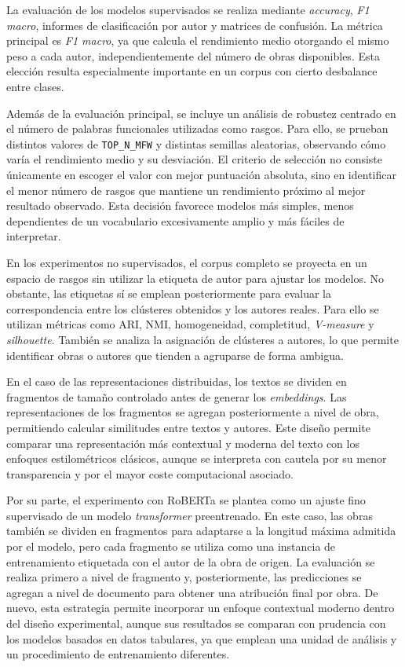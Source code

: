 \documentclass[IB]{TFUOC}%
\begin{document}
La evaluación de los modelos supervisados se realiza mediante \textit{accuracy}, \textit{F1 macro}, informes de clasificación por autor y matrices de confusión. La métrica principal es \textit{F1 macro}, ya que calcula el rendimiento medio otorgando el mismo peso a cada autor, independientemente del número de obras disponibles. Esta elección resulta especialmente importante en un corpus con cierto desbalance entre clases.

Además de la evaluación principal, se incluye un análisis de robustez centrado en el número de palabras funcionales utilizadas como rasgos. Para ello, se prueban distintos valores de \texttt{TOP\_N\_MFW} y distintas semillas aleatorias, observando cómo varía el rendimiento medio y su desviación. El criterio de selección no consiste únicamente en escoger el valor con mejor puntuación absoluta, sino en identificar el menor número de rasgos que mantiene un rendimiento próximo al mejor resultado observado. Esta decisión favorece modelos más simples, menos dependientes de un vocabulario excesivamente amplio y más fáciles de interpretar.

En los experimentos no supervisados, el corpus completo se proyecta en un espacio de rasgos sin utilizar la etiqueta de autor para ajustar los modelos. No obstante, las etiquetas sí se emplean posteriormente para evaluar la correspondencia entre los clústeres obtenidos y los autores reales. Para ello se utilizan métricas como ARI, NMI, homogeneidad, completitud, \textit{V-measure} y \textit{silhouette}. También se analiza la asignación de clústeres a autores, lo que permite identificar obras o autores que tienden a agruparse de forma ambigua.

En el caso de las representaciones distribuidas, los textos se dividen en fragmentos de tamaño controlado antes de generar los \textit{embeddings}. Las representaciones de los fragmentos se agregan posteriormente a nivel de obra, permitiendo calcular similitudes entre textos y autores. Este diseño permite comparar una representación más contextual y moderna del texto con los enfoques estilométricos clásicos, aunque se interpreta con cautela por su menor transparencia y por el mayor coste computacional asociado.

Por su parte, el experimento con RoBERTa se plantea como un ajuste fino supervisado de un modelo \textit{transformer} preentrenado. En este caso, las obras también se dividen en fragmentos para adaptarse a la longitud máxima admitida por el modelo, pero cada fragmento se utiliza como una instancia de entrenamiento etiquetada con el autor de la obra de origen. La evaluación se realiza primero a nivel de fragmento y, posteriormente, las predicciones se agregan a nivel de documento para obtener una atribución final por obra. De nuevo, esta estrategia permite incorporar un enfoque contextual moderno dentro del diseño experimental, aunque sus resultados se comparan con prudencia con los modelos basados en datos tabulares, ya que emplean una unidad de análisis y un procedimiento de entrenamiento diferentes.
\end{document}
